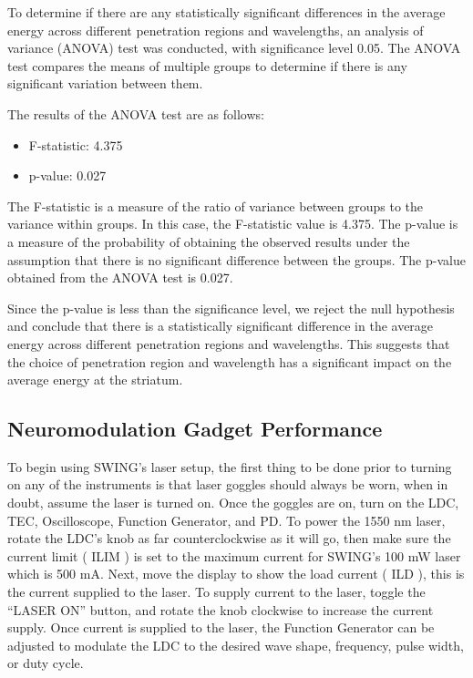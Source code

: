 \documentclass[journal,twoside,web]{ieeecolor}
\begin{document}
To determine if there are any statistically significant differences in the average energy across different penetration regions and wavelengths, an analysis of variance (ANOVA) test was conducted, with significance level 0.05. The ANOVA test compares the means of multiple groups to determine if there is any significant variation between them.

The results of the ANOVA test are as follows:

\begin{itemize}
    \item F-statistic: 4.375
    \item p-value: 0.027
\end{itemize}

The F-statistic is a measure of the ratio of variance between groups to the variance within groups. In this case, the F-statistic value is 4.375. The p-value is a measure of the probability of obtaining the observed results under the assumption that there is no significant difference between the groups. The p-value obtained from the ANOVA test is 0.027.

Since the p-value is less than the significance level, we reject the null hypothesis and conclude that there is a statistically significant difference in the average energy across different penetration regions and wavelengths. This suggests that the choice of penetration region and wavelength has a significant impact on the average energy at the striatum.

\subsection{Neuromodulation Gadget Performance}

To begin using SWING’s laser setup, the first thing to be done prior to turning on any of the instruments is that laser goggles should always be worn, when in doubt, assume the laser is turned on. \cite{b10} Once the goggles are on, turn on the LDC, TEC, Oscilloscope, Function Generator, and PD. To power the 1550 nm laser, rotate the LDC’s knob as far counterclockwise as it will go, then make sure the current limit (
ILIM 
) is set to the maximum current for SWING’s 100 mW laser which is 500 mA. Next, move the display to show the load current (
ILD 
), this is the current supplied to the laser. To supply current to the laser, toggle the “LASER ON” button, and rotate the knob clockwise to increase the current supply. Once current is supplied to the laser, the Function Generator can be adjusted to modulate the LDC to the desired wave shape, frequency, pulse width, or duty cycle. 
\end{document}
